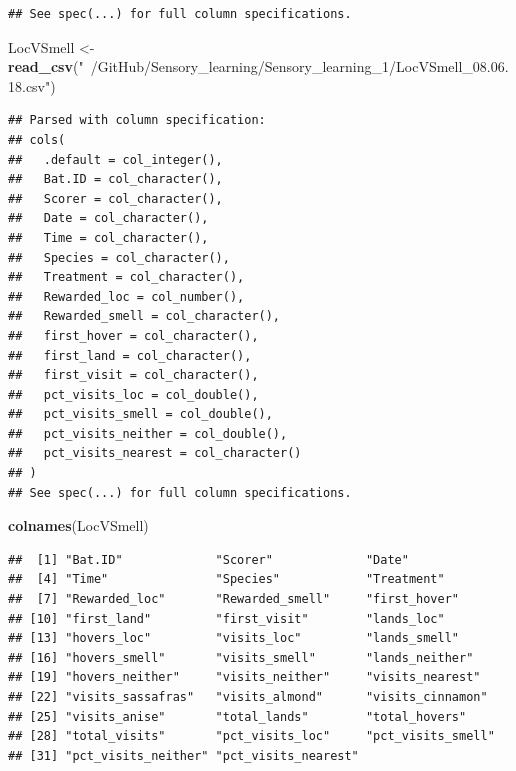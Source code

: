 \documentclass[]{article}
\newenvironment{Shaded}{\begin{snugshade}}{\end{snugshade}}
\newcommand{\KeywordTok}[1]{\textcolor[rgb]{0.13,0.29,0.53}{\textbf{{#1}}}}
\newcommand{\StringTok}[1]{\textcolor[rgb]{0.31,0.60,0.02}{{#1}}}
\newcommand{\NormalTok}[1]{{#1}}
\begin{document}
\begin{verbatim}
## See spec(...) for full column specifications.
\end{verbatim}

\begin{Shaded}
\begin{Highlighting}[]
\NormalTok{LocVSmell <-}\StringTok{ }\KeywordTok{read_csv}\NormalTok{(}\StringTok{"~/GitHub/Sensory_learning/Sensory_learning_1/LocVSmell_08.06.18.csv"}\NormalTok{)}
\end{Highlighting}
\end{Shaded}

\begin{verbatim}
## Parsed with column specification:
## cols(
##   .default = col_integer(),
##   Bat.ID = col_character(),
##   Scorer = col_character(),
##   Date = col_character(),
##   Time = col_character(),
##   Species = col_character(),
##   Treatment = col_character(),
##   Rewarded_loc = col_number(),
##   Rewarded_smell = col_character(),
##   first_hover = col_character(),
##   first_land = col_character(),
##   first_visit = col_character(),
##   pct_visits_loc = col_double(),
##   pct_visits_smell = col_double(),
##   pct_visits_neither = col_double(),
##   pct_visits_nearest = col_character()
## )
## See spec(...) for full column specifications.
\end{verbatim}

\begin{Shaded}
\begin{Highlighting}[]
\KeywordTok{colnames}\NormalTok{(LocVSmell)}
\end{Highlighting}
\end{Shaded}

\begin{verbatim}
##  [1] "Bat.ID"             "Scorer"             "Date"              
##  [4] "Time"               "Species"            "Treatment"         
##  [7] "Rewarded_loc"       "Rewarded_smell"     "first_hover"       
## [10] "first_land"         "first_visit"        "lands_loc"         
## [13] "hovers_loc"         "visits_loc"         "lands_smell"       
## [16] "hovers_smell"       "visits_smell"       "lands_neither"     
## [19] "hovers_neither"     "visits_neither"     "visits_nearest"    
## [22] "visits_sassafras"   "visits_almond"      "visits_cinnamon"   
## [25] "visits_anise"       "total_lands"        "total_hovers"      
## [28] "total_visits"       "pct_visits_loc"     "pct_visits_smell"  
## [31] "pct_visits_neither" "pct_visits_nearest"
\end{verbatim}
\end{document}
